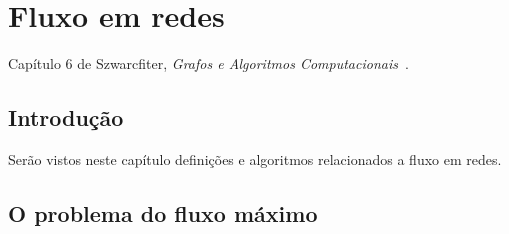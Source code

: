 \chapter{Fluxo em redes}

Capítulo 6 de Szwarcfiter, \textit{Grafos e Algoritmos Computacionais}~\cite{Szwarcfiter1986grafos}.

\section{Introdução}

Serão vistos neste capítulo definições e algoritmos relacionados a fluxo em redes.

\section{O problema do fluxo máximo}


